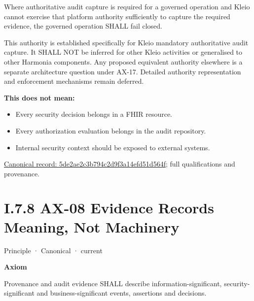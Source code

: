 Where authoritative audit capture is required for a governed operation and
Kleio cannot exercise that platform authority sufficiently to capture the
required evidence, the governed operation SHALL fail closed.



This authority is established specifically for Kleio mandatory authoritative
audit capture. It SHALL NOT be inferred for other Kleio activities or generalised
to other Harmonia components. Any proposed equivalent authority elsewhere is
a separate architecture question under AX-17. Detailed authority representation
and enforcement mechanisms remain deferred.



\textbf{This does not mean:}



\begin{itemize}


\item Every security decision belongs in a FHIR resource.

\item Every authorization evaluation belongs in the audit repository.

\item Internal security context should be exposed to external systems.

\end{itemize}

{\footnotesize \href{../../../../continuum/motivation/principle/5de2ae2c3b794c2d9f3a14efd51d564f.md}{Canonical record: 5de2ae2c3b794c2d9f3a14efd51d564f}; full qualifications and provenance.}\par
\section*{I.7.8 AX-08 Evidence Records Meaning, Not Machinery}
\label{navigation:I.7.8}

\label{element:21d6864657964ba5b03e3f6b5eb29cd5}
{\small Principle · Canonical · current}\par

\par\medskip\textbf{Axiom}\par


Provenance and audit evidence SHALL describe information-significant,
security-significant and business-significant events, assertions and
decisions.



